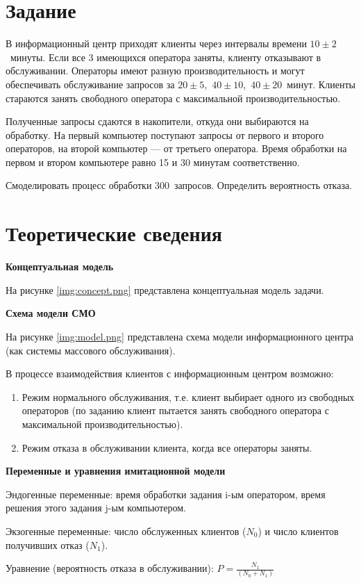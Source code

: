 \section*{Задание}

В информационный центр приходят клиенты через интервалы времени $10\pm2$~минуты.
Если все 3 имеющихся оператора заняты, клиенту отказывают в обслуживании.
Операторы имеют разную производительность и могут обеспечивать обслуживание
запросов за $20\pm5$,~$40\pm10$,~$40\pm20$~минут. Клиенты стараются
занять свободного оператора с максимальной производительностью.

Полученные запросы сдаются в накопители, откуда они выбираются на
обработку. На первый компьютер поступают запросы от первого и второго операторов, на
второй компьютер --- от третьего оператора. Время обработки на первом и втором
компьютере равно 15 и 30 минутам соответственно.

Смоделировать процесс обработки $300$~запросов. Определить вероятность отказа.

\section*{Теоретические сведения}
\textbf{Концептуальная модель}

На рисунке \ref{img:concept.png} представлена концептуальная модель задачи.

\textbf{Схема модели СМО}

На рисунке \ref{img:model.png} представлена схема модели информационного центра (как системы массового обслуживания).

В процессе взаимодействия клиентов с информационным центром возможно:
\begin{enumerate}
    \item Режим нормального обслуживания, т.е. клиент выбирает одного из свободных
операторов (по заданию клиент пытается занять свободного оператора с максимальной производительностью).
    \item Режим отказа в обслуживании клиента, когда все операторы заняты.
\end{enumerate}

\textbf{Переменные и уравнения имитационной модели}

Эндогенные переменные: время обработки задания i-ым оператором, время решения этого задания j-ым компьютером.

Экзогенные переменные: число обслуженных клиентов ($N_0$) и число клиентов получивших отказ ($N_1$). 

Уравнение (вероятность отказа в обслуживании): 
$P = \frac{N_1}{(N_0 + N_1)}$

